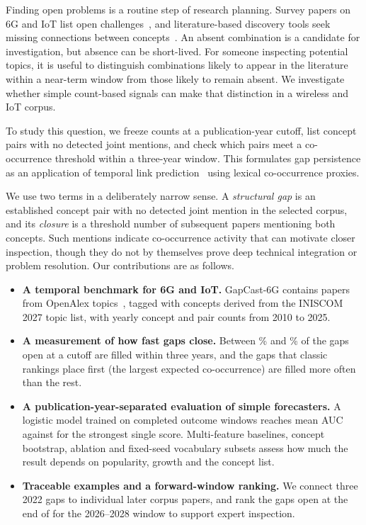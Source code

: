 \documentclass[runningheads]{llncs}
\newcommand{\bench}{GapCast-6G}
\begin{document}
Finding open problems is a routine step of research planning. Survey papers on 6G and IoT list open challenges~\cite{saad2020vision,dang2020what,letaief2019roadmap}, and literature-based discovery tools seek missing connections between concepts~\cite{swanson1986fish,krenn2020semnet,krenn2023forecasting}. An absent combination is a candidate for investigation, but absence can be short-lived. For someone inspecting potential topics, it is useful to distinguish combinations likely to appear in the literature within a near-term window from those likely to remain absent. We investigate whether simple count-based signals can make that distinction in a wireless and IoT corpus.

To study this question, we freeze counts at a publication-year cutoff, list concept pairs with no detected joint mentions, and check which pairs meet a co-occurrence threshold within a three-year window. This formulates gap persistence as an application of temporal link prediction~\cite{liben2007link,krenn2023forecasting} using lexical co-occurrence proxies.

We use two terms in a deliberately narrow sense. A \emph{structural gap} is an established concept pair with no detected joint mention in the selected corpus, and its \emph{closure} is a threshold number of subsequent papers mentioning both concepts. Such mentions indicate co-occurrence activity that can motivate closer inspection, though they do not by themselves prove deep technical integration or problem resolution. Our contributions are as follows.
\begin{itemize}
\item \textbf{A temporal benchmark for 6G and IoT.} \bench{} contains \nWorks{} papers from \nTopics{} OpenAlex topics~\cite{priem2022openalex}, tagged with \nConcepts{} concepts derived from the INISCOM 2027 topic list, with yearly concept and pair counts from 2010 to 2025.
\item \textbf{A measurement of how fast gaps close.} Between \fillMin{}\% and \fillMax{}\% of the gaps open at a cutoff are filled within three years, and the gaps that classic rankings place first (the largest expected co-occurrence) are filled more often than the rest.
\item \textbf{A publication-year-separated evaluation of simple forecasters.} A logistic model trained on completed outcome windows reaches mean AUC \learnedAUC{} against \bestBaseAUC{} for the strongest single score. Multi-feature baselines, concept bootstrap, ablation and fixed-seed vocabulary subsets assess how much the result depends on popularity, growth and the concept list.
\item \textbf{Traceable examples and a forward-window ranking.} We connect three 2022 gaps to individual later corpus papers, and rank the \fcGaps{} gaps open at the end of \fcT{} for the 2026--2028 window to support expert inspection.
\end{itemize}
\end{document}
